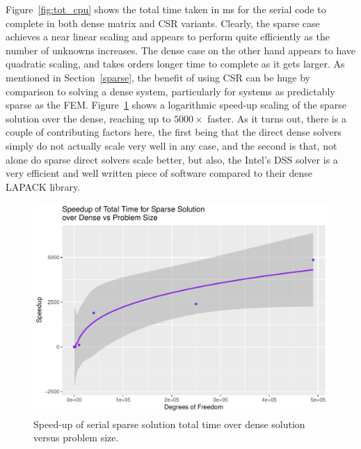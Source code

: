 Figure~\ref{fig:tot_cpu} shows the total time taken in ms for the serial code to complete in both dense matrix and CSR variants. Clearly, the sparse case achieves a near linear scaling and appears to perform quite efficiently as the number of unknowns increases. The dense case on the other hand appears to have quadratic scaling, and takes orders longer time to complete as it gets larger. As mentioned in Section~\ref{sparse}, the benefit of using CSR can be huge by comparison to solving a dense system, particularly for systems as predictably sparse as the FEM. Figure~\ref{fig:cpu_tot_su} shows a logarithmic speed-up scaling of the sparse solution over the dense, reaching up to $5000\times$ faster. As it turns out, there is a couple of contributing factors here, the first being that the direct dense solvers simply do not actually scale very well in any case, and the second is that, not alone do sparse direct solvers scale better, but also, the Intel's DSS solver is a very efficient and well written piece of software compared to their dense LAPACK library. 

\begin{figure}
	\centering
	\includegraphics[width=0.48\linewidth]{Plots/total_sparse_dense_cpu_speedup_vs_n}
	\caption{Speed-up of serial sparse solution total time over dense solution versus problem size.}
	\label{fig:cpu_tot_su}
\end{figure}

